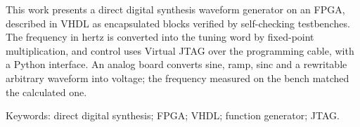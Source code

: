 This work presents a direct digital synthesis waveform generator on an FPGA, described in VHDL as encapsulated blocks verified by self-checking testbenches. The frequency in hertz is converted into the tuning word by fixed-point multiplication, and control uses Virtual JTAG over the programming cable, with a Python interface. An analog board converts sine, ramp, sinc and a rewritable arbitrary waveform into voltage; the frequency measured on the bench matched the calculated one.

\vspace{\onelineskip}
\noindent Keywords: direct digital synthesis; FPGA; VHDL; function generator; JTAG.
